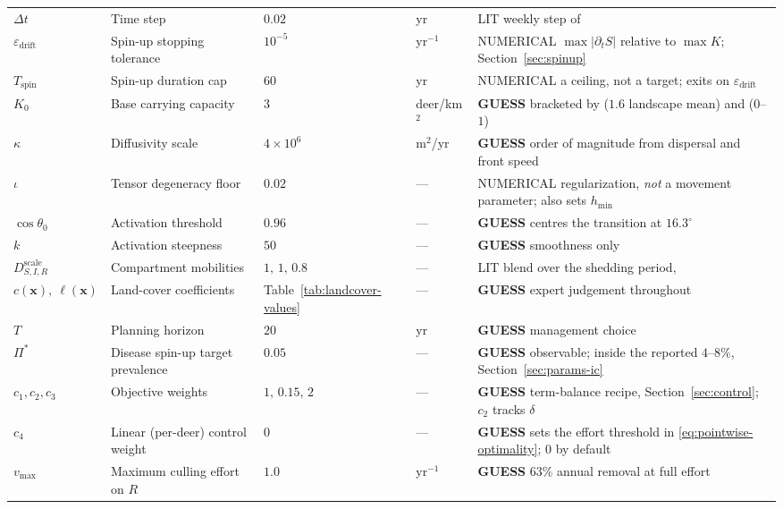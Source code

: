 \documentclass[11pt]{article}
\newcommand{\tagLIT}{{\footnotesize\textsf{\textcolor{green!40!black}{LIT}}}}
\newcommand{\tagGUESS}{{\footnotesize\textsf{\textbf{\textcolor{red!70!black}{GUESS}}}}}
\newcommand{\tagNUM}{{\footnotesize\textsf{\textcolor{purple!70!black}{NUMERICAL}}}}
\newcommand{\guessrow}{\rowcolor{guessbg}}
\begin{document}
\begin{table}[h]
\begin{tabular}{@{}llllp{4.6cm}@{}}
$\Delta t$ & Time step & $0.02$ & yr & \tagLIT{} weekly step of \citet{Almberg2011} \\
$\varepsilon_{\text{drift}}$ & Spin-up stopping tolerance & $10^{-5}$ & yr$^{-1}$ & \tagNUM{} $\max|\partial_t S|$ relative to $\max K$; Section~\ref{sec:spinup} \\
$T_{\text{spin}}$ & Spin-up duration cap & $60$ & yr & \tagNUM{} a ceiling, not a target; exits on $\varepsilon_{\text{drift}}$ \\
\guessrow $K_0$ & Base carrying capacity & $3$ & deer/km$^2$ & \tagGUESS{} bracketed by \citet{Geremia2015} ($1.6$ landscape mean) and \citet{Miller2006} ($0$--$1$) \\
\guessrow $\kappa$ & Diffusivity scale & $4\times10^{6}$ & m$^2$/yr & \tagGUESS{} order of magnitude from dispersal and front speed \\
$\iota$ & Tensor degeneracy floor & $0.02$ & --- & \tagNUM{} regularization, \emph{not} a movement parameter; also sets $h_{\min}$ \\
\guessrow $\cos\theta_0$ & Activation threshold & $0.96$ & --- & \tagGUESS{} centres the transition at $16.3^\circ$ \\
\guessrow $k$ & Activation steepness & $50$ & --- & \tagGUESS{} smoothness only \\
$D_{S,I,R}^{\text{scale}}$ & Compartment mobilities & $1,\,1,\,0.8$ & --- & \tagLIT{} blend over the shedding period, \citet{Barrile2024} \\
\guessrow $c(\mathbf{x}),\ \ell(\mathbf{x})$ & Land-cover coefficients & Table~\ref{tab:landcover-values} & --- & \tagGUESS{} expert judgement throughout \\
\guessrow $T$ & Planning horizon & $20$ & yr & \tagGUESS{} management choice \\
\guessrow $\Pi^\ast$ & Disease spin-up target prevalence & $0.05$ & --- & \tagGUESS{} observable; inside the reported $4$--$8\%$, Section~\ref{sec:params-ic} \\
\guessrow $c_1,c_2,c_3$ & Objective weights & $1,\,0.15,\,2$ & --- & \tagGUESS{} term-balance recipe, Section~\ref{sec:control}; $c_2$ tracks $\delta$ \\
\guessrow $c_4$ & Linear (per-deer) control weight & $0$ & --- & \tagGUESS{} sets the effort threshold in \eqref{eq:pointwise-optimality}; $0$ by default \\
\guessrow $v_{\max}$ & Maximum culling effort on $R$ & $1.0$ & yr$^{-1}$ & \tagGUESS{} $63\%$ annual removal at full effort \\
\bottomrule
\end{tabular}
\end{table}
\end{document}
